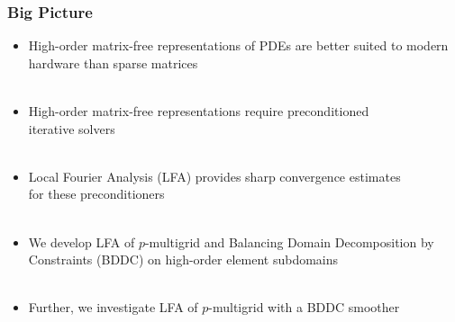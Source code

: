 \documentclass{beamer}
\begin{document}
\begin{frame}
\begin{center}
\frametitle{Big Picture}

\begin{itemize}

\item High-order matrix-free representations of PDEs are better suited to modern hardware than sparse matrices\\

~\\

\item High-order matrix-free representations require preconditioned\\iterative solvers\\

~\\

\item Local Fourier Analysis (LFA) provides sharp convergence estimates\\for these preconditioners\\

~\\

\item We develop LFA of $p$-multigrid and Balancing Domain Decomposition by Constraints (BDDC) on high-order element subdomains\\

~\\

\item Further, we investigate LFA of $p$-multigrid with a BDDC smoother

\end{itemize}

\end{center}
\end{frame}

\end{document}
